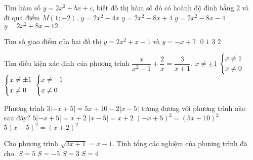 \begin{ex}%
	Tìm hàm số $y=2x^2+bx+c$, biết đồ thị hàm số đó có hoành độ đỉnh bằng $2$ và đi qua điểm $M(1;-2)$.
	\choice
	{$y=2x^2-4x$}
	{\True $y=2x^2-8x+4$}
	{$y=2x^2-8x-4$}
	{$y=2x^2+8x-12$}
\end{ex}
\begin{ex}%
	Tìm số giao điểm của hai đồ thị $y=2x^2+x-1$ và $y=-x+7$.
	\choice
	{$0$}
	{$1$}
	{$3$}
	{\True $2$}
\end{ex}
\begin{ex}%
	Tìm điều kiện xác định của phương trình $\dfrac{x}{x^2-1}+\dfrac{2}{x}=\dfrac{3}{x+1}$.
	\choice
	{$x\ne \pm1$}
	{$\left\{\begin{aligned}&x\ne 1\\&x\ne 0\end{aligned}\right.$}
	{\True $\left\{\begin{aligned}&x\ne \pm 1\\&x\ne 0\end{aligned}\right.$}
	{$\left\{\begin{aligned}&x\ne -1\\&x\ne 0\end{aligned}\right.$}
\end{ex}
\begin{ex}%
	Phương trình $3|-x+5|=5x+10-2|x-5|$ tương đương với phương trình nào sau đây?
	\choice
	{$5|-x+5|=x+2$}
	{\True $|x-5|=x+2$}
	{$(-x+5)^2=(5x+10)^2$}
	{$5(x-5)^2=(x+2)^2$}
\end{ex}
\begin{ex}%
	Cho phương trình $\sqrt{3x+1}=x-1$. Tính tổng các nghiệm của phương trình đã cho.
	\choice
	{\True $S=5$}
	{$S=-5$}
	{$S=3$}
	{$S=4$}
\end{ex}
